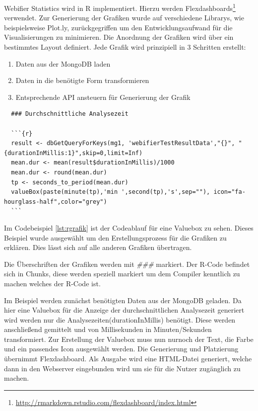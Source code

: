 Webifier Statistics wird in R implementiert. Hierzu werden Flexdashboards\footnote{\url{http://rmarkdown.rstudio.com/flexdashboard/index.html}} verwendet. Zur Generierung der Grafiken wurde auf verschiedene Librarys, wie beispielsweise Plot.ly, zurückgegriffen um den Entwicklungsaufwand für die Visualisierungen zu minimieren. Die Anordnung der Grafiken wird über ein bestimmtes Layout definiert. Jede Grafik wird prinzipiell in 3 Schritten erstellt:

\begin{enumerate}
  \item Daten aus der MongoDB laden
  \item Daten in die benötigte Form transformieren
  \item Entsprechende API ansteuern für Generierung der Grafik
\end{enumerate}

\begin{scriptsize}
\begin{lstlisting}
  ### Durchschnittliche Analysezeit

  ```{r}
  result <- dbGetQueryForKeys(mg1, 'webifierTestResultData',"{}", "{durationInMillis:1}",skip=0,limit=Inf)
  mean.dur <- mean(result$durationInMillis)/1000
  mean.dur <- round(mean.dur)
  tp <- seconds_to_period(mean.dur)
  valueBox(paste(minute(tp),'min ',second(tp),'s',sep=""), icon="fa-hourglass-half",color="grey")
  ```
\end{lstlisting}
\end{scriptsize}

Im Codebeispiel \ref{lst:rgrafik} ist der Codeablauf für eine Valuebox zu sehen. Dieses Beispiel wurde ausgewählt um den Erstellungsprozess für die Grafiken zu erklären. Dies lässt sich auf alle anderen Grafiken übertragen.

Die Überschriften der Grafiken werden mit \textit{\#\#\#} markiert. Der R-Code befindet sich in Chunks, diese werden speziell markiert um dem Compiler kenntlich zu machen welches der R-Code ist.

Im Beispiel werden zunächst benötigten Daten aus der MongoDB geladen. Da hier eine Valuebox für die Anzeige der durchschnittlichen Analysezeit generiert wird werden nur die Analysezeiten(durationInMillis) benötigt. Diese werden anschließend gemittelt und von Millisekunden in Minuten/Sekunden transformiert. Zur Erstellung der Valuebox muss nun nurnoch der Text, die Farbe und ein passendes Icon ausgewählt werden. Die Generierung und Platzierung übernimmt Flexdashboard. Als Ausgabe wird eine HTML-Datei generiert, welche dann in den Webserver eingebunden wird um sie für die Nutzer zugänglich zu machen.

